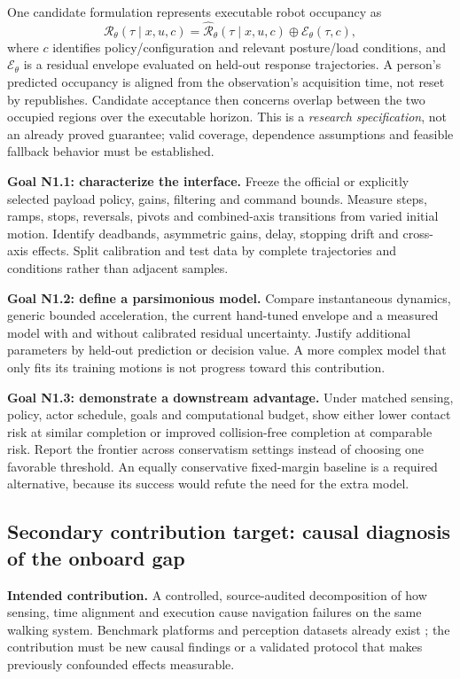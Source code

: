 One candidate formulation represents executable robot occupancy as
\begin{equation}
\mathcal{R}_{\theta}(\tau\mid x,u,c)
=\widehat{\mathcal{R}}_{\theta}(\tau\mid x,u,c)
\oplus\mathcal{E}_{\theta}(\tau,c),
\end{equation}
where $c$ identifies policy/configuration and relevant posture/load conditions,
and $\mathcal{E}_{\theta}$ is a residual envelope evaluated on held-out response
trajectories. A person's predicted occupancy is aligned from the observation's
acquisition time, not reset by republishes. Candidate acceptance then concerns
overlap between the two occupied regions over the executable horizon. This is a
\emph{research specification}, not an already proved guarantee; valid coverage,
dependence assumptions and feasible fallback behavior must be established.

\textbf{Goal N1.1: characterize the interface.} Freeze the official or explicitly
selected payload policy, gains, filtering and command bounds. Measure steps,
ramps, stops, reversals, pivots and combined-axis transitions from varied initial
motion. Identify deadbands, asymmetric gains, delay, stopping drift and
cross-axis effects. Split calibration and test data by complete trajectories and
conditions rather than adjacent samples.

\textbf{Goal N1.2: define a parsimonious model.} Compare instantaneous dynamics,
generic bounded acceleration, the current hand-tuned envelope and a measured
model with and without calibrated residual uncertainty. Justify additional
parameters by held-out prediction or decision value. A more complex model that
only fits its training motions is not progress toward this contribution.

\textbf{Goal N1.3: demonstrate a downstream advantage.} Under matched sensing,
policy, actor schedule, goals and computational budget, show either lower contact
risk at similar completion or improved collision-free completion at comparable
risk. Report the frontier across conservatism settings instead of choosing one
favorable threshold. An equally conservative fixed-margin baseline is a required
alternative, because its success would refute the need for the extra model.

\subsection{Secondary contribution target: causal diagnosis of the onboard gap}
\label{goal:diagnosis}
\textbf{Intended contribution.} A controlled, source-audited decomposition of
how sensing, time alignment and execution cause navigation failures on the same
walking system. Benchmark platforms and perception datasets already exist
\citep{socnavbench,jrdb,metaurban,omninav}; the contribution must be new causal
findings or a validated protocol that makes previously confounded effects
measurable.

